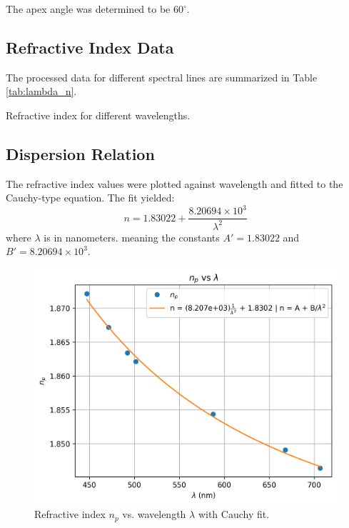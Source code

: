 \documentclass[journal]{IEEEtran}
\begin{document}
The apex angle was determined to be $60^\circ$.

\subsection{Refractive Index Data}
The processed data for different spectral lines are summarized in Table \ref{tab:lambda_n}.

\begin{table}[H]
    \centering
    \caption{Refractive index for different wavelengths.}
    \label{tab:lambda_n}
\end{table}

\subsection{Dispersion Relation}
The refractive index values were plotted against wavelength and fitted to the Cauchy-type equation. The fit yielded:
\begin{equation}
n = 1.83022 + \frac{8.20694 \times 10^3}{\lambda^2}
\end{equation}
where \( \lambda \) is in nanometers.
meaning the constants \( A' = 1.83022 \) and \( B' = 8.20694 \times 10^3 \).
\begin{figure}[H]
    \centering
    \includegraphics[width=0.8\linewidth]{../plots/npVSlambda.png}
    \caption{Refractive index $n_p$ vs. wavelength $\lambda$ with Cauchy fit.}
    \label{fig:np_vs_lambda}
\end{figure}
\end{document}
